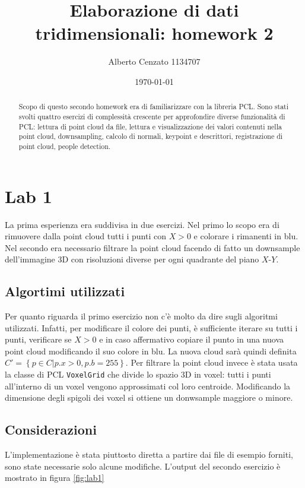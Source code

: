 \documentclass[a4paper]{article}
\title{Elaborazione di dati tridimensionali: homework 2}
\author{Alberto Cenzato 1134707}
\date{\today}
\begin{document}
\maketitle

\begin{abstract}
Scopo di questo secondo homework era di familiarizzare con la libreria PCL. Sono stati svolti quattro esercizi di complessità crescente per approfondire diverse funzionalità di PCL: lettura di point cloud da file, lettura e visualizzazione dei valori contenuti nella point cloud, downsampling, calcolo di normali, keypoint e descrittori, registrazione di point cloud, people detection.
\end{abstract}

\section{Lab 1} \label{sec:lab1}
La prima esperienza era suddivisa in due esercizi. Nel primo lo scopo era di rimuovere dalla point cloud tutti i punti con $X > 0$ e colorare i rimanenti in blu. Nel secondo era necessario filtrare la point cloud facendo di fatto un downsample dell'immagine 3D con risoluzioni diverse per ogni quadrante del piano $X$-$Y$.

	\subsection{Algortimi utilizzati} \label{sec:lab1_alg}
	Per quanto riguarda il primo esercizio non c'è molto da dire sugli algoritmi utilizzati. Infatti, per modificare il colore dei punti, è sufficiente iterare su tutti i punti, verificare se $X > 0$ e in caso affermativo copiare il punto in una nuova point cloud modificando il suo colore in blu. La nuova cloud sarà quindi definita $C' = \left\{p \in C | p.x > 0, p.b = 255 \right\}$.
	Per filtrare la point cloud invece è stata usata la classe di PCL \verb|VoxelGrid| che divide lo spazio 3D in voxel: tutti i punti all'interno di un voxel vengono approssimati col loro centroide. Modificando la dimensione degli spigoli dei voxel si ottiene un donwsample maggiore o minore.
	
	\subsection{Considerazioni} \label{sec:lab1_disc}
	L'implementazione è stata piuttosto diretta a partire dai file di esempio forniti, sono state necessarie solo alcune modifiche. L'output del secondo esercizio è mostrato in figura \ref{fig:lab1} 
	
\end{document}
